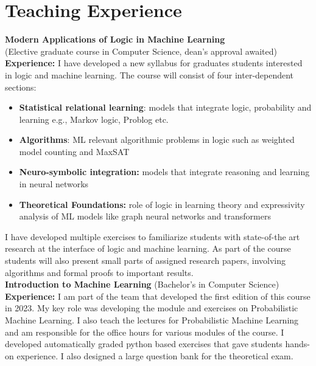 \documentclass[10pt, a4paper]{article}
\newcommand{\years}[1]{\marginnote{\scriptsize #1}}
\begin{document}
\section*{Teaching Experience}

\years{2024\\ (Winter Semester)} \textbf{Modern Applications of Logic in Machine Learning}\\ (Elective graduate course in Computer Science, dean's approval awaited)\\ 
\textbf{Experience:} I have developed a new syllabus for graduates students interested in logic and machine learning. The course will consist of four inter-dependent sections: 
\begin{itemize}
    \item \textbf{Statistical relational learning}: models that integrate logic, probability and learning e.g., Markov logic, Problog etc. 
    \item \textbf{Algorithms}: ML relevant algorithmic problems in logic such as weighted model counting and MaxSAT 
    \item \textbf{Neuro-symbolic integration:} models that integrate reasoning and learning in neural networks
    \item \textbf{Theoretical Foundations:} role of logic in learning theory and expressivity analysis of ML models like graph neural networks and transformers
\end{itemize}
I have developed multiple exercises to familiarize students with state-of-the art research at the interface of logic and machine learning. As part of the course students will also present small parts of assigned research papers, involving algorithms and formal proofs to important results.\\


\years{2023 - Now} \textbf{Introduction to Machine Learning} (Bachelor's in Computer Science)\\
\textbf{Experience:} I am part of the team that developed the first edition of this course in 2023. My key role was developing the module and exercises on Probabilistic Machine Learning. I also teach the lectures for Probabilistic Machine Learning and am responsible for the office hours for various modules of the course. I developed automatically graded python based exercises that gave students hands-on experience. I also designed a large question bank for the theoretical exam. \\
\end{document}
